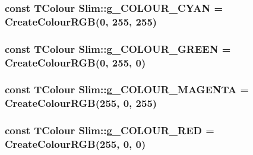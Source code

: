 \subsubsection[{g\+\_\+\+C\+O\+L\+O\+U\+R\+\_\+\+C\+Y\+A\+N}]{\setlength{\rightskip}{0pt plus 5cm}const {\bf T\+Colour} Slim\+::g\+\_\+\+C\+O\+L\+O\+U\+R\+\_\+\+C\+Y\+A\+N = {\bf Create\+Colour\+R\+G\+B}(0, 255, 255)}\label{namespace_slim_a3f18a21d67a8e4342f45d6dc38491e84}
\hypertarget{namespace_slim_a9720f56180098de9f641858511f0a3f8}{}
\subsubsection[{g\+\_\+\+C\+O\+L\+O\+U\+R\+\_\+\+G\+R\+E\+E\+N}]{\setlength{\rightskip}{0pt plus 5cm}const {\bf T\+Colour} Slim\+::g\+\_\+\+C\+O\+L\+O\+U\+R\+\_\+\+G\+R\+E\+E\+N = {\bf Create\+Colour\+R\+G\+B}(0, 255, 0)}\label{namespace_slim_a9720f56180098de9f641858511f0a3f8}
\hypertarget{namespace_slim_a78adc5a20e7e82b76aa186b20213e74d}{}
\subsubsection[{g\+\_\+\+C\+O\+L\+O\+U\+R\+\_\+\+M\+A\+G\+E\+N\+T\+A}]{\setlength{\rightskip}{0pt plus 5cm}const {\bf T\+Colour} Slim\+::g\+\_\+\+C\+O\+L\+O\+U\+R\+\_\+\+M\+A\+G\+E\+N\+T\+A = {\bf Create\+Colour\+R\+G\+B}(255, 0, 255)}\label{namespace_slim_a78adc5a20e7e82b76aa186b20213e74d}
\hypertarget{namespace_slim_a3ebe25e5235634ded92715ea38733109}{}
\subsubsection[{g\+\_\+\+C\+O\+L\+O\+U\+R\+\_\+\+R\+E\+D}]{\setlength{\rightskip}{0pt plus 5cm}const {\bf T\+Colour} Slim\+::g\+\_\+\+C\+O\+L\+O\+U\+R\+\_\+\+R\+E\+D = {\bf Create\+Colour\+R\+G\+B}(255, 0, 0)}\label{namespace_slim_a3ebe25e5235634ded92715ea38733109}
\hypertarget{namespace_slim_ae8fc69dad906fd2dda213c5f71c59923}{}
